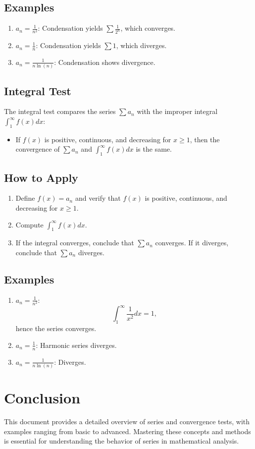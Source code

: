 \documentclass[a4paper, 12pt]{article}
\begin{document}
\subsection*{Examples}
\begin{enumerate}
    \item \(a_n = \frac{1}{n^2}\): Condensation yields \(\sum \frac{1}{2^n}\), which converges.
    \item \(a_n = \frac{1}{n}\): Condensation yields \(\sum 1\), which diverges.
    \item \(a_n = \frac{1}{n \ln(n)}\): Condensation shows divergence.
\end{enumerate}

\subsection{Integral Test}
The integral test compares the series \(\sum a_n\) with the improper integral \(\int_1^\infty f(x) dx\):
\begin{itemize}
    \item If \(f(x)\) is positive, continuous, and decreasing for \(x \geq 1\), then the convergence of \(\sum a_n\) and \(\int_1^\infty f(x)dx\) is the same.
\end{itemize}

\subsection*{How to Apply}
\begin{enumerate}
    \item Define \(f(x) = a_n\) and verify that \(f(x)\) is positive, continuous, and decreasing for \(x \geq 1\).
    \item Compute \(\int_1^\infty f(x) dx\).
    \item If the integral converges, conclude that \(\sum a_n\) converges. If it diverges, conclude that \(\sum a_n\) diverges.
\end{enumerate}

\subsection*{Examples}
\begin{enumerate}
    \item \(a_n = \frac{1}{n^2}\):
    \[\int_1^\infty \frac{1}{x^2} dx = 1,\]
    hence the series converges.

    \item \(a_n = \frac{1}{n}\): Harmonic series diverges.

    \item \(a_n = \frac{1}{n \ln(n)}\): Diverges.
\end{enumerate}

\section{Conclusion}
This document provides a detailed overview of series and convergence tests, with examples ranging from basic to advanced. Mastering these concepts and methods is essential for understanding the behavior of series in mathematical analysis.
\end{document}
